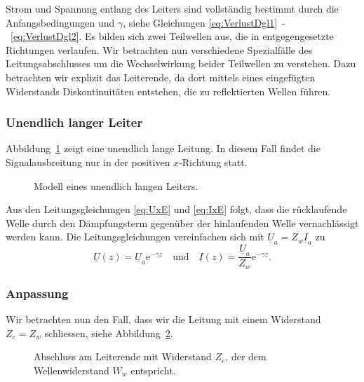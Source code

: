 \documentclass[paper=a4, parskip=half-, ngerman, fontsize=11pt]{scrreprt}
\begin{document}
Strom und Spannung entlang des Leiters sind vollständig bestimmt durch die Anfangsbedingungen und $\gamma$, siehe
Gleichungen \eqref{eq:VerlustDgl1}~-~\eqref{eq:VerlustDgl2}. Es bilden sich zwei Teilwellen aus, die in
entgegengesetzte Richtungen verlaufen. Wir betrachten nun verschiedene Spezialfälle des Leitungsabschlusses um die
Wechselwirkung beider Teilwellen zu verstehen. Dazu betrachten wir explizit das Leiterende, da dort mittels eines
eingefügten Widerstands Diskontinuitäten entstehen, die zu reflektierten Wellen führen.

\subsubsection{Unendlich langer Leiter}

Abbildung~\ref{OhneAbschluss} zeigt eine unendlich lange Leitung. In diesem Fall findet die Signalausbreitung nur in
der positiven $x$-Richtung statt.
\begin{figure}[!htb]
    \begin{center}
        
        \caption{Modell eines unendlich langen Leiters.}
        \label{OhneAbschluss}
    \end{center}
\end{figure}
Aus den Leitungsgleichungen \eqref{eq:UxE} und \eqref{eq:IxE} folgt, dass die rücklaufende Welle durch den
Dämpfungsterm gegenüber der hinlaufenden Welle vernachlässigt werden kann. Die Leitungsgleichungen vereinfachen sich
mit $\underline{U}_{a} = Z_{w} \underline{I}_{a}$ zu
\[ \underline{U}(z) = \underline{U}_{a} \mathrm{e}^{- \gamma z} \quad \text{und} \quad
 \underline{I}(z) = \frac{\underline{U}_{a}}{Z_{w}} \mathrm{e}^{- \gamma z}. \]

\subsubsection{Anpassung}
Wir betrachten nun den Fall, dass wir die Leitung mit einem Widerstand $Z_{e} = Z_{w}$ schliessen, siehe
Abbildung~\ref{AbschlussMitWiderstand}.
\begin{figure}[!htb]
    \begin{center}
        
        \caption{Abschluss am Leiterende mit Widerstand $Z_{e}$, der dem Wellenwiderstand $W_{w}$ entspricht.}
        \label{AbschlussMitWiderstand}
    \end{center}
\end{figure}
\end{document}

